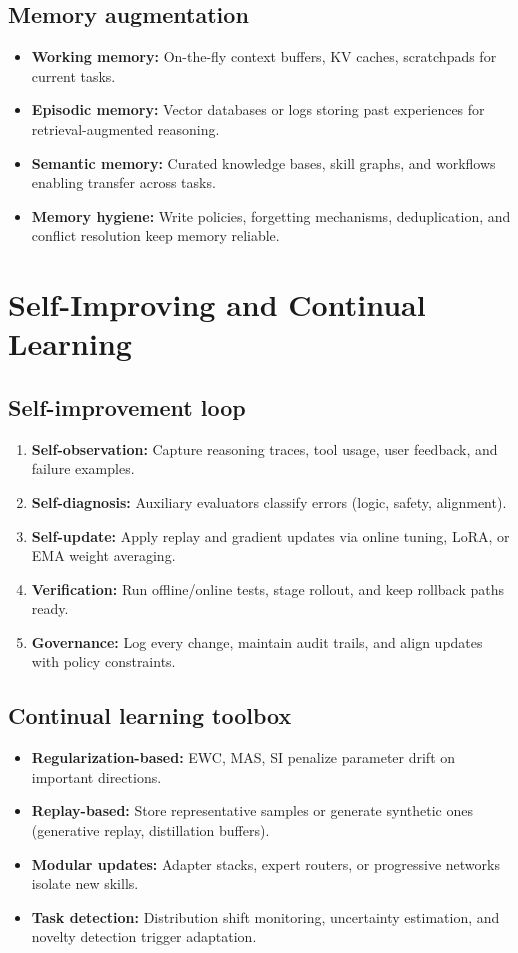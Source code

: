 \documentclass{article}
\begin{document}
\subsection{Memory augmentation}
\begin{itemize}
  \item \textbf{Working memory:} On-the-fly context buffers, KV caches, scratchpads for current tasks.
  \item \textbf{Episodic memory:} Vector databases or logs storing past experiences for retrieval-augmented reasoning.
  \item \textbf{Semantic memory:} Curated knowledge bases, skill graphs, and workflows enabling transfer across tasks.
  \item \textbf{Memory hygiene:} Write policies, forgetting mechanisms, deduplication, and conflict resolution keep memory reliable.
\end{itemize}

\section{Self-Improving and Continual Learning}
\subsection{Self-improvement loop}
\begin{enumerate}
  \item \textbf{Self-observation:} Capture reasoning traces, tool usage, user feedback, and failure examples.
  \item \textbf{Self-diagnosis:} Auxiliary evaluators classify errors (logic, safety, alignment).
  \item \textbf{Self-update:} Apply replay and gradient updates via online tuning, LoRA, or EMA weight averaging.
  \item \textbf{Verification:} Run offline/online tests, stage rollout, and keep rollback paths ready.
  \item \textbf{Governance:} Log every change, maintain audit trails, and align updates with policy constraints.
\end{enumerate}

\subsection{Continual learning toolbox}
\begin{itemize}
  \item \textbf{Regularization-based:} EWC, MAS, SI penalize parameter drift on important directions.
  \item \textbf{Replay-based:} Store representative samples or generate synthetic ones (generative replay, distillation buffers).
  \item \textbf{Modular updates:} Adapter stacks, expert routers, or progressive networks isolate new skills.
  \item \textbf{Task detection:} Distribution shift monitoring, uncertainty estimation, and novelty detection trigger adaptation.
\end{itemize}
\end{document}
